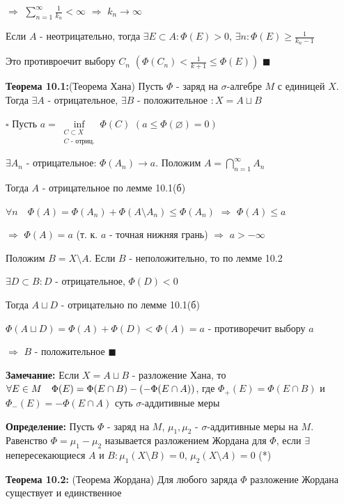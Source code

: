 \documentclass[a4paper]{report}
\newcommand*{\hm}[1]{#1\nobreak\discretionary{}%
            {\hbox{$\mathsurround=0pt #1$}}{}}
\begin{document}
$\Rightarrow$ $\sum\limits_{n=1}^\infty\displaystyle\frac{1}{k_n}<\infty$ $\Rightarrow$ $k_n\to\infty$

Если $A$ - неотрицательно, тогда $\exists E\subset A\colon\Phi(E)>0$, $\exists n\colon\Phi(E)\ge\displaystyle\frac{1}{k_n-1}$

Это противроечит выбору $C_n$ $\left(\Phi(C_n)<\displaystyle\frac{1}{k+1}\le\Phi(E)\right)$ $\blacksquare$
\bigskip


\noindent\textbf{Теорема 10.1:}(Теорема Хана) Пусть $\Phi$ - заряд на $\sigma$-алгебре $M$ с единицей $X$. Тогда $\exists A$ - отрицательное, $\exists B$ - положительное $\colon X=A\sqcup B$

\noindent$\square$ Пусть $a=\inf\limits_{\substack{C\subset X\\C\text{ - отриц.}}}\Phi(C)$ $\left(a\le\Phi(\varnothing)=0\right)$

$\exists A_n$ - отрицательное: $\Phi(A_n)\to a$. Положим $A=\bigcap\limits_{n=1}^\infty A_n$

Тогда $A$ - отрицательное по лемме 10.1(б)

$\forall n\quad\Phi(A)=\Phi(A_n)+\Phi(A\setminus A_n)\le\Phi(A_n)$ $\Rightarrow$ $\Phi(A)\le a$

$\Rightarrow$ $\Phi(A)=a$ (т. к. $a$ - точная нижняя грань) $\Rightarrow$ $a>-\infty$

Положим $B=X\setminus A$. Если $B$ - неположительно, то по лемме 10.2

\noindent$\exists D\subset B\colon D$ - отрицательное, $\Phi(D)<0$

Тогда $A\sqcup D$ - отрицательно по лемме 10.1(б)

$\Phi(A\sqcup D)=\Phi(A)+\Phi(D)<\Phi(A)=a$ - противоречит выбору $a$

$\Rightarrow$ $B$ - положительное $\blacksquare$


\bigskip

\noindent\textbf{Замечание:} Если $X=A\sqcup B$ - разложение Хана, то $\forall E\in M\quad\Phi(E)\hm=\Phi(E\cap B)-(-\Phi(E\cap A))$, где $\Phi_+(E)=\Phi(E\cap B)$ и
$\Phi_-(E)=-\Phi(E\cap A)$ суть $\sigma$-аддитивные меры
\bigskip

\noindent\textbf{Определение:} Пусть $\Phi$ - заряд на $M$, $\mu_1,\mu_2$ - $\sigma$-аддитивные меры на $M$. Равенство $\Phi=\mu_1-\mu_2$ называется разложением Жордана для $\Phi$, если $\exists$ непересекающиеся $A$ и $B\colon\mu_1(X\setminus B)=0$, $\mu_2(X\setminus A)=0$ (*)
\bigskip

\noindent\textbf{Теорема 10.2:} (Теорема Жордана) Для любого заряда $\Phi$ разложение Жордана существует и единственное
\end{document}
